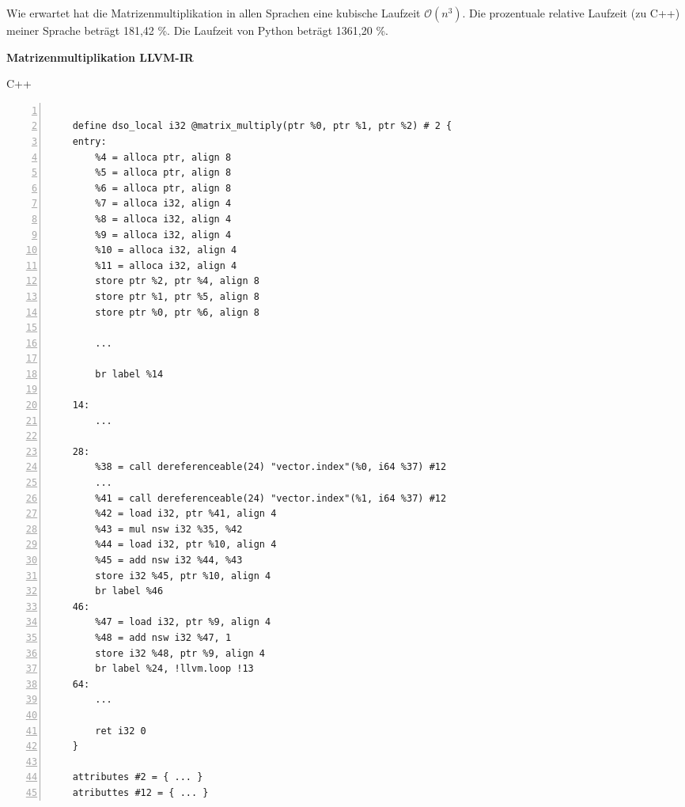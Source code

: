    \begin{adjustwidth}{2.5cm}{-1cm}  %
        
        \begin{minipage}{0.32\textwidth}
        \end{minipage}

    \end{adjustwidth}

    Wie erwartet hat die Matrizenmultiplikation in allen Sprachen eine kubische Laufzeit \(\mathcal{O}(n^3)\).
    Die prozentuale relative Laufzeit (zu C++) meiner Sprache beträgt 181,42 \%.
    Die Laufzeit von Python beträgt 1361,20 \%.

    \begin{center}
        \textbf{Matrizenmultiplikation LLVM-IR}
    \end{center}

    \begin{center}
        C++
    \end{center}

    \begin{lstlisting}[basicstyle=\tiny, numbers=left]

    define dso_local i32 @matrix_multiply(ptr %0, ptr %1, ptr %2) # 2 {
    entry:
        %4 = alloca ptr, align 8
        %5 = alloca ptr, align 8
        %6 = alloca ptr, align 8
        %7 = alloca i32, align 4
        %8 = alloca i32, align 4
        %9 = alloca i32, align 4
        %10 = alloca i32, align 4
        %11 = alloca i32, align 4
        store ptr %2, ptr %4, align 8
        store ptr %1, ptr %5, align 8
        store ptr %0, ptr %6, align 8

        ...

        br label %14

    14:
        ...

    28:
        %38 = call dereferenceable(24) "vector.index"(%0, i64 %37) #12
        ...
        %41 = call dereferenceable(24) "vector.index"(%1, i64 %37) #12
        %42 = load i32, ptr %41, align 4
        %43 = mul nsw i32 %35, %42
        %44 = load i32, ptr %10, align 4
        %45 = add nsw i32 %44, %43
        store i32 %45, ptr %10, align 4
        br label %46
    46:
        %47 = load i32, ptr %9, align 4
        %48 = add nsw i32 %47, 1
        store i32 %48, ptr %9, align 4
        br label %24, !llvm.loop !13
    64:
        ...

        ret i32 0
    } 

    attributes #2 = { ... }
    atributtes #12 = { ... }

    \end{lstlisting}

